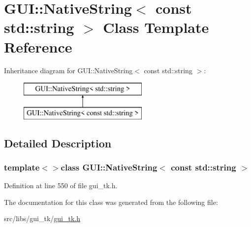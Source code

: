 \hypertarget{classGUI_1_1NativeString_3_01const_01std_1_1string_01_4}{\section{G\-U\-I\-:\-:Native\-String$<$ const std\-:\-:string $>$ Class Template Reference}
\label{classGUI_1_1NativeString_3_01const_01std_1_1string_01_4}
}
Inheritance diagram for G\-U\-I\-:\-:Native\-String$<$ const std\-:\-:string $>$\-:\begin{figure}[H]
\begin{center}
\leavevmode
\includegraphics[height=2.000000cm]{classGUI_1_1NativeString_3_01const_01std_1_1string_01_4}
\end{center}
\end{figure}


\subsection{Detailed Description}
\subsubsection*{template$<$$>$class G\-U\-I\-::\-Native\-String$<$ const std\-::string $>$}



Definition at line 550 of file gui\-\_\-tk.\-h.



The documentation for this class was generated from the following file\-:\begin{DoxyCompactItemize}
\item 
src/libs/gui\-\_\-tk/\hyperlink{gui__tk_8h}{gui\-\_\-tk.\-h}\end{DoxyCompactItemize}
